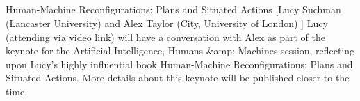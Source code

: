\begin{sessions}
 \\
\end{sessions}

\begin{sessions}
 \\
 \\
 \\
    {Human-Machine Reconfigurations: Plans and Situated Actions%
}%
    [Lucy Suchman (Lancaster University) and Alex Taylor (City, University of London)%
]%
    {Lucy (attending via video link) will have a conversation with Alex as part of the keynote for the Artificial Intelligence, Humans \&amp; Machines session, reflecting upon Lucy's highly influential book Human-Machine Reconfigurations: Plans and Situated Actions.
More details about this keynote will be published closer to the time.%
}
 \\
 \\
\end{sessions}
